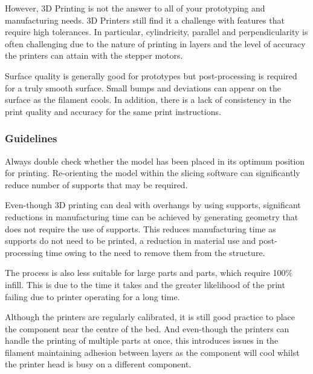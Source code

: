 However, 3D Printing is not the answer to all of your prototyping and manufacturing needs. 3D Printers still find it a challenge with features that require high tolerances. In particular, cylindricity, parallel and perpendicularity is often challenging due to the nature of printing in layers and the level of accuracy the printers can attain with the stepper motors. 

Surface quality is generally good for prototypes but post-processing is required for a truly smooth surface. Small bumps and deviations can appear on the surface as the filament cools. In addition, there is a lack of consistency in the print quality and accuracy for the same print instructions.


\subsubsection{Guidelines}

Always double check whether the model has been placed in its optimum position for printing. Re-orienting the model within the slicing software can significantly reduce number of supports that may be required.

Even-though 3D printing can deal with overhangs by using supports, significant reductions in manufacturing time can be achieved by generating geometry that does not require the use of supports. This reduces manufacturing time as supports do not need to be printed, a reduction in material use and post-processing time owing to the need to remove them from the structure.

The process is also less suitable for large parts and parts, which require 100\% infill. This is due to the time it takes and the greater likelihood of the print failing due to printer operating for a long time.

Although the printers are regularly calibrated, it is still good practice to place the component near the centre of the bed. And even-though the printers can handle the printing of multiple parts at once, this introduces issues in the filament maintaining adhesion between layers as the component will cool whilst the printer head is busy on a different component.